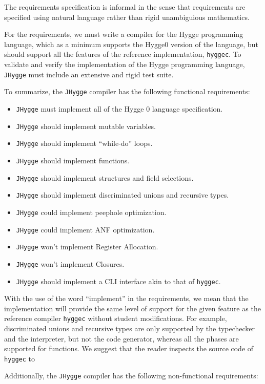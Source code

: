 The requirements specification is informal in the sense that requirements are specified using natural language rather than rigid unambiguious mathematics.

For the requirements, we must write a compiler for the Hygge programming language, which as a minimum supports the Hygge0 version of the language,
but should support all the features of the reference implementation, \texttt{hyggec}.
To validate and verify the implementation of the Hygge programming language, \texttt{JHygge} must include an extensive and rigid test suite.

To summarize, the \texttt{JHygge} compiler has the following functional requirements:

\begin{itemize}
  \item \texttt{JHygge} must implement all of the Hygge 0 language specification.
  \item \texttt{JHygge} should implement mutable variables.
  \item \texttt{JHygge} should implement ``while-do'' loops.
  \item \texttt{JHygge} should implement functions.
  \item \texttt{JHygge} should implement structures and field selections.
  \item \texttt{JHygge} should implement discriminated unions and recursive types.
  \item \texttt{JHygge} could implement peephole optimization.
  \item \texttt{JHygge} could implement ANF optimization.
  \item \texttt{JHygge} won't implement Register Allocation.
  \item \texttt{JHygge} won't implement Closures.
  \item \texttt{JHygge} should implement a CLI interface akin to that of \texttt{hyggec}.
\end{itemize}

With the use of the word ``implement'' in the requirements, we mean that the implementation will provide the same level of support
for the given feature as the reference compiler \texttt{hyggec} without student modifications. For example, discriminated unions
and recursive types are only supported by the typechecker and the interpreter, but not the code generator, whereas all the phases
are supported for functions. We suggest that the reader inspects the source code of \texttt{hyggec} to 

Additionally, the \texttt{JHygge} compiler has the following non-functional requirements:

